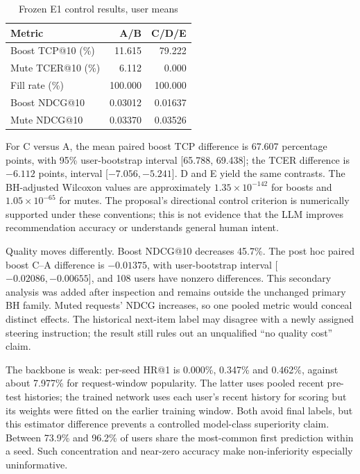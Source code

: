 \documentclass[conference]{IEEEtran}
\begin{document}
\begin{table}[t]\centering\small
\caption{Frozen E1 control results, user means}\label{tab:e1}
\begin{tabular}{lrr}\toprule
Metric & A/B & C/D/E\\\midrule
Boost TCP@10 (\%) &11.615&79.222\\
Mute TCER@10 (\%) &6.112&0.000\\
Fill rate (\%) &100.000&100.000\\
Boost NDCG@10 &0.03012&0.01637\\
Mute NDCG@10 &0.03370&0.03526\\\bottomrule
\end{tabular}\end{table}

For C versus A, the mean paired boost TCP difference is 67.607 percentage points, with 95\% user-bootstrap interval [65.788, 69.438]; the TCER difference is $-6.112$ points, interval [$-7.056,-5.241$]. D and E yield the same contrasts. The BH-adjusted Wilcoxon values are approximately $1.35\times10^{-142}$ for boosts and $1.05\times10^{-65}$ for mutes. The proposal's directional control criterion is numerically supported under these conventions; this is not evidence that the LLM improves recommendation accuracy or understands general human intent.

Quality moves differently. Boost NDCG@10 decreases 45.7\%. The post hoc paired boost C--A difference is $-0.01375$, with user-bootstrap interval [$-0.02086,-0.00655$], and 108 users have nonzero differences. This secondary analysis was added after inspection and remains outside the unchanged primary BH family. Muted requests' NDCG increases, so one pooled metric would conceal distinct effects. The historical next-item label may disagree with a newly assigned steering instruction; the result still rules out an unqualified ``no quality cost'' claim.

The backbone is weak: per-seed HR@1 is 0.000\%, 0.347\% and 0.462\%, against about 7.977\% for request-window popularity. The latter uses pooled recent pre-test histories; the trained network uses each user's recent history for scoring but its weights were fitted on the earlier training window. Both avoid final labels, but this estimator difference prevents a controlled model-class superiority claim. Between 73.9\% and 96.2\% of users share the most-common first prediction within a seed. Such concentration and near-zero accuracy make non-inferiority especially uninformative.
\end{document}
